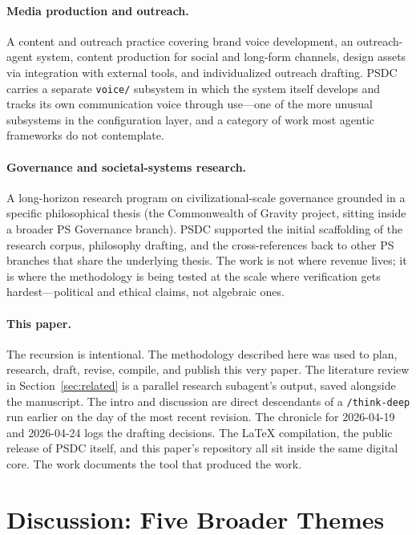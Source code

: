 \documentclass[12pt]{article}
\begin{document}
\paragraph{Media production and outreach.} A content and outreach practice covering brand voice development, an outreach-agent system, content production for social and long-form channels, design assets via integration with external tools, and individualized outreach drafting. PSDC carries a separate \texttt{voice/} subsystem in which the system itself develops and tracks its own communication voice through use---one of the more unusual subsystems in the configuration layer, and a category of work most agentic frameworks do not contemplate.

\paragraph{Governance and societal-systems research.} A long-horizon research program on civilizational-scale governance grounded in a specific philosophical thesis (the Commonwealth of Gravity project, sitting inside a broader PS Governance branch). PSDC supported the initial scaffolding of the research corpus, philosophy drafting, and the cross-references back to other PS branches that share the underlying thesis. The work is not where revenue lives; it is where the methodology is being tested at the scale where verification gets hardest---political and ethical claims, not algebraic ones.

\paragraph{This paper.} The recursion is intentional. The methodology described here was used to plan, research, draft, revise, compile, and publish this very paper. The literature review in Section~\ref{sec:related} is a parallel research subagent's output, saved alongside the manuscript. The intro and discussion are direct descendants of a \texttt{/think-deep} run earlier on the day of the most recent revision. The chronicle for 2026-04-19 and 2026-04-24 logs the drafting decisions. The LaTeX compilation, the public release of PSDC itself, and this paper's repository all sit inside the same digital core. The work documents the tool that produced the work.

\section{Discussion: Five Broader Themes}
\label{sec:themes}
\end{document}

